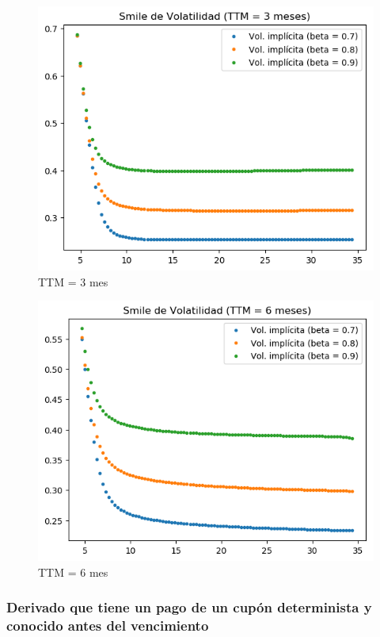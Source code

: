 \documentclass[titlepage]{article}
\begin{document}
\begin{figure}[!]
	\centering
	\includegraphics[scale=0.65]{TTM3}
	\caption{TTM = 3 mes}
\end{figure}

\begin{figure}[!]
	\centering
	\includegraphics[scale=0.65]{TTM6}
	\caption{TTM = 6 mes}
\end{figure}

\newpage
\subsubsection*{Derivado que tiene un pago de un cupón determinista y conocido antes del vencimiento}
\end{document}
